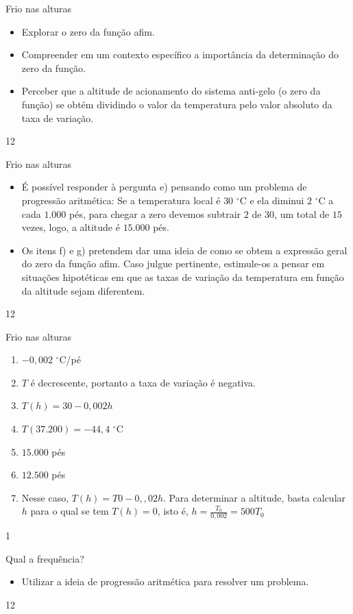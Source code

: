 \clearmargin
\begin{objectives}{Frio nas alturas}
{
\begin{itemize}
\item Explorar o zero da função afim.
\item Compreender em um contexto específico a importância da determinação do zero da função.
\item Perceber que a altitude de acionamento do sistema anti-gelo (o zero da função) se obtém dividindo o valor da temperatura pelo valor absoluto da taxa de variação.
\end{itemize}
}{1}{2}
\end{objectives}
\begin{sugestions}{Frio nas alturas}
{
\begin{itemize}
\item É possível responder à pergunta e) pensando como um problema de progressão aritmética: Se a temperatura local é $30$ $^{\circ}$C e ela diminui $2$ $^{\circ}$C a cada $1.000$ pés, para chegar a zero devemos subtrair $2$ de $30$, um total de $15$ vezes, logo, a altitude é $15.000$ pés.
\item Os itens f) e g) pretendem dar uma ideia de como se obtem a expressão geral do zero da função afim. Caso julgue pertinente, estimule-os a pensar em situações hipotéticas em que as taxas de variação da temperatura em função da altitude sejam diferentem.
\end{itemize}
}{1}{2}
\end{sugestions}
\begin{answer}{Frio nas alturas}
{
\begin{enumerate}

\item $−0{,}002$ $^{\circ}$C/pé
\item $T$ é decrescente, portanto a taxa de variação é negativa.
\item $T(h)=30−0{,}002h$
\item $T(37.200)=−44{,}4$ $^{\circ}$C
\item $15.000$ pés
\item $12.500$ pés
\item Nesse caso, $T(h)=T0−0,{,}02h$. Para determinar a altitude, basta calcular $h$ para o qual se tem $T(h)=0$, isto é, $h=\displaystyle\frac{T_0}{0{,}002}=500T_0$
\end{enumerate}
}{1}
\end{answer}
\clearmargin
\clearmargin
\begin{objectives}{Qual a frequência?}
{
\begin{itemize}
\item Utilizar a ideia de progressão aritmética para resolver um problema.
\end{itemize}
}{1}{2}
\end{objectives}
